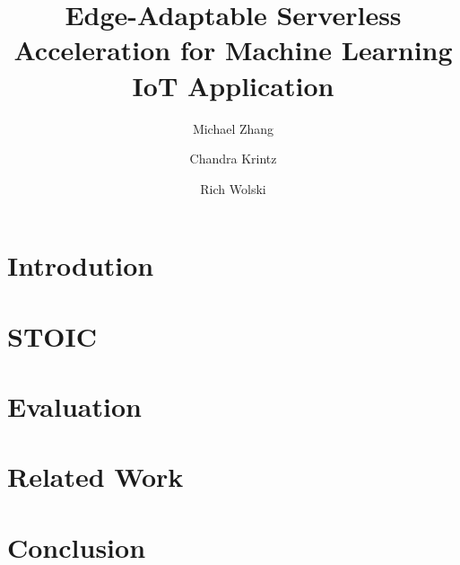 \documentclass[11pt,sigplan, anonymous, authorversion]{acmart}
\begin{document}
\title{Edge-Adaptable Serverless Acceleration for Machine Learning IoT Application}
\author{Michael Zhang}
\author{Chandra Krintz}
\author{Rich Wolski}





\begin{abstract}
\label{sec:abstract}

\end{abstract}

\maketitle



\section{Introdution}
\label{sec:intro}


\section{STOIC}
\label{sec:stoic}


\section{Evaluation}
\label{sec:results}


\section{Related Work}
\label{sec:related}



\section{Conclusion}
\label{sec:conc}





% 


\end{document}
